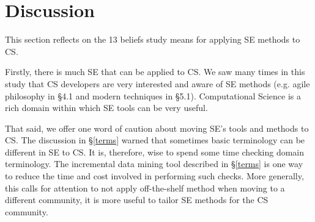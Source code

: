 \documentclass[sigconf,review,anonymous]{acmart}
\begin{document}




\section{Discussion}
This section reflects on the 13 beliefs study means for
applying SE methods to CS.

Firstly, there is much SE that can be applied to CS. We saw many times in this study that CS developers are very interested and aware of SE methods (e.g. agile philosophy in \S4.1 and modern techniques in \S5.1). Computational Science is a rich domain within which SE tools can be very useful.

That said,  we offer one word of caution about moving SE's tools and methods to CS. The discussion in \S\ref{terms} warned that sometimes basic terminology can be different in SE to CS. It is, therefore, wise to spend some time checking domain terminology. The incremental data mining tool described in \S\ref{terms} is one way to reduce the time and cost
involved in performing such checks. More generally, this calls for attention to not apply off-the-shelf method when moving to a different community, it is more useful to tailor SE methods for the CS community.
\end{document}
